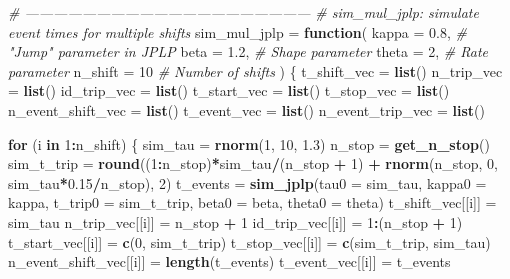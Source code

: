 \documentclass[
]{article}
\newenvironment{Shaded}{\begin{snugshade}}{\end{snugshade}}
\newcommand{\CommentTok}[1]{\textcolor[rgb]{0.56,0.35,0.01}{\textit{#1}}}
\newcommand{\ControlFlowTok}[1]{\textcolor[rgb]{0.13,0.29,0.53}{\textbf{#1}}}
\newcommand{\DataTypeTok}[1]{\textcolor[rgb]{0.13,0.29,0.53}{#1}}
\newcommand{\DecValTok}[1]{\textcolor[rgb]{0.00,0.00,0.81}{#1}}
\newcommand{\FloatTok}[1]{\textcolor[rgb]{0.00,0.00,0.81}{#1}}
\newcommand{\KeywordTok}[1]{\textcolor[rgb]{0.13,0.29,0.53}{\textbf{#1}}}
\newcommand{\NormalTok}[1]{#1}
\newcommand{\OperatorTok}[1]{\textcolor[rgb]{0.81,0.36,0.00}{\textbf{#1}}}
\newcommand{\StringTok}[1]{\textcolor[rgb]{0.31,0.60,0.02}{#1}}
\begin{document}
\begin{Shaded}
\begin{Highlighting}[]
\CommentTok{# ------------------------------------------------------------}
\CommentTok{# sim_mul_jplp: simulate event times for multiple shifts}
\NormalTok{sim_mul_jplp =}\StringTok{ }\ControlFlowTok{function}\NormalTok{(}
  \DataTypeTok{kappa =} \FloatTok{0.8}\NormalTok{,      }\CommentTok{# "Jump" parameter in JPLP}
  \DataTypeTok{beta =} \FloatTok{1.2}\NormalTok{,       }\CommentTok{# Shape parameter}
  \DataTypeTok{theta =} \DecValTok{2}\NormalTok{,        }\CommentTok{# Rate parameter}
  \DataTypeTok{n_shift =} \DecValTok{10}      \CommentTok{# Number of shifts}
\NormalTok{)}
\NormalTok{\{}
\NormalTok{  t_shift_vec =}\StringTok{ }\KeywordTok{list}\NormalTok{()}
\NormalTok{  n_trip_vec =}\StringTok{ }\KeywordTok{list}\NormalTok{()}
\NormalTok{  id_trip_vec =}\StringTok{ }\KeywordTok{list}\NormalTok{()}
\NormalTok{  t_start_vec =}\StringTok{ }\KeywordTok{list}\NormalTok{()}
\NormalTok{  t_stop_vec =}\StringTok{ }\KeywordTok{list}\NormalTok{()}
\NormalTok{  n_event_shift_vec =}\StringTok{ }\KeywordTok{list}\NormalTok{()}
\NormalTok{  t_event_vec =}\StringTok{ }\KeywordTok{list}\NormalTok{()}
\NormalTok{  n_event_trip_vec =}\StringTok{ }\KeywordTok{list}\NormalTok{()}

  \ControlFlowTok{for}\NormalTok{ (i }\ControlFlowTok{in} \DecValTok{1}\OperatorTok{:}\NormalTok{n_shift) \{}
\NormalTok{    sim_tau =}\StringTok{ }\KeywordTok{rnorm}\NormalTok{(}\DecValTok{1}\NormalTok{, }\DecValTok{10}\NormalTok{, }\FloatTok{1.3}\NormalTok{)}
\NormalTok{    n_stop =}\StringTok{ }\KeywordTok{get_n_stop}\NormalTok{()}
\NormalTok{    sim_t_trip =}\StringTok{ }\KeywordTok{round}\NormalTok{((}\DecValTok{1}\OperatorTok{:}\NormalTok{n_stop)}\OperatorTok{*}\NormalTok{sim_tau}\OperatorTok{/}\NormalTok{(n_stop }\OperatorTok{+}\StringTok{ }\DecValTok{1}\NormalTok{) }\OperatorTok{+}
\StringTok{                         }\KeywordTok{rnorm}\NormalTok{(n_stop, }\DecValTok{0}\NormalTok{, sim_tau}\OperatorTok{*}\FloatTok{0.15}\OperatorTok{/}\NormalTok{n_stop), }\DecValTok{2}\NormalTok{)}
\NormalTok{    t_events =}\StringTok{ }\KeywordTok{sim_jplp}\NormalTok{(}\DataTypeTok{tau0 =}\NormalTok{ sim_tau,}
                        \DataTypeTok{kappa0 =}\NormalTok{ kappa,}
                        \DataTypeTok{t_trip0 =}\NormalTok{ sim_t_trip,}
                        \DataTypeTok{beta0 =}\NormalTok{ beta,}
                        \DataTypeTok{theta0 =}\NormalTok{ theta)}
\NormalTok{    t_shift_vec[[i]] =}\StringTok{ }\NormalTok{sim_tau}
\NormalTok{    n_trip_vec[[i]] =}\StringTok{ }\NormalTok{n_stop }\OperatorTok{+}\StringTok{ }\DecValTok{1}
\NormalTok{    id_trip_vec[[i]] =}\StringTok{ }\DecValTok{1}\OperatorTok{:}\NormalTok{(n_stop }\OperatorTok{+}\StringTok{ }\DecValTok{1}\NormalTok{)}
\NormalTok{    t_start_vec[[i]] =}\StringTok{ }\KeywordTok{c}\NormalTok{(}\DecValTok{0}\NormalTok{, sim_t_trip)}
\NormalTok{    t_stop_vec[[i]]  =}\StringTok{ }\KeywordTok{c}\NormalTok{(sim_t_trip, sim_tau)}
\NormalTok{    n_event_shift_vec[[i]] =}\StringTok{ }\KeywordTok{length}\NormalTok{(t_events)}
\NormalTok{    t_event_vec[[i]] =}\StringTok{ }\NormalTok{t_events}


\end{Highlighting}
\end{Shaded}
\end{document}
